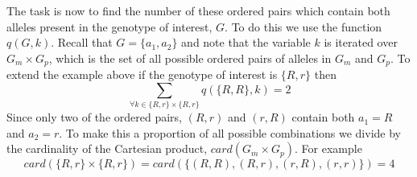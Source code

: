 \documentclass[10pt,letterpaper]{article}
\begin{document}
The task is now to find the number of these ordered pairs which contain both alleles present in the genotype of interest, $G$. To do this we use the function $q(G, k)$. Recall that $G = \{a_1, a_2\}$ and note that the variable $k$ is iterated over $G_m \times G_p$, which is the set of all possible ordered pairs of alleles in $G_m$ and $G_p$. To extend the example above if the genotype of interest is $\{R, r\}$ then 
\begin{equation*}
	\sum_{\forall k \in \{R, r\} \times \{R, r\}} q(\{R, R \}, k) = 2
\end{equation*}    
Since only two of the ordered pairs, $(R, r)$ and $(r, R)$ contain both $a_1 = R$ and $a_2 = r$. To make this a proportion of all possible combinations we divide by the cardinality of the Cartesian product, $card \left( G_m \times G_p \right)$. For example 
\begin{equation*}
	card\left( \{R, r\} \times \{R, r\} \right) = card\left( \{(R, R), (R, r), (r, R), (r, r)\} \right) = 4
\end{equation*}
\end{document}
